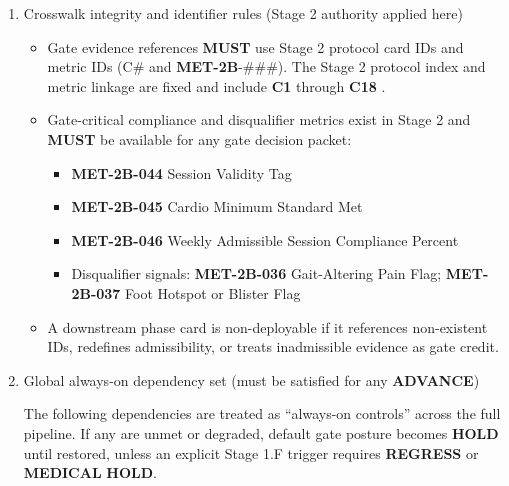 \documentclass[10pt]{article}
\begin{document}
\begin{enumerate}
\begin{itemize}
\item Phase transitions (mid-phase decision points and end-of-phase exit gates) \textbf{MUST} occur only inside Stage 3 protected deload/test windows.
\item Missed/invalid gate tests trigger reslot to the next available protected window; they \textbf{MUST} NOT be “made up” by stacking high-cost tests into a compressed week.
\item If a valid test cannot be executed under comparable conditions, it is not “close enough.” It is \textbf{INVALID} for gate use, and the correct action is reslot and retest.
\end{itemize}

\item Crosswalk integrity and identifier rules (Stage 2 authority applied here)

\begin{itemize}
\item Gate evidence references \textbf{MUST} use Stage 2 protocol card IDs and metric IDs (C\# and \textbf{MET-2B}-###). The Stage 2 protocol index and metric linkage are fixed and include \textbf{C1} through \textbf{C18} .
\item Gate-critical compliance and disqualifier metrics exist in Stage 2 and \textbf{MUST} be available for any gate decision packet:
\begin{itemize}
\item \textbf{MET-2B-044} Session Validity Tag
\item \textbf{MET-2B-045} Cardio Minimum Standard Met
\item \textbf{MET-2B-046} Weekly Admissible Session Compliance Percent
\item Disqualifier signals: \textbf{MET-2B-036} Gait-Altering Pain Flag; \textbf{MET-2B-037} Foot Hotspot or Blister Flag
\end{itemize}
\item A downstream phase card is non-deployable if it references non-existent IDs, redefines admissibility, or treats inadmissible evidence as gate credit.
\end{itemize}

\item Global always-on dependency set (must be satisfied for any \textbf{ADVANCE})

The following dependencies are treated as “always-on controls” across the full pipeline. If any are unmet or degraded, default gate posture becomes \textbf{HOLD} until restored, unless an explicit Stage 1.F trigger requires \textbf{REGRESS} or \textbf{MEDICAL} \textbf{HOLD}.


\end{enumerate}
\end{document}
